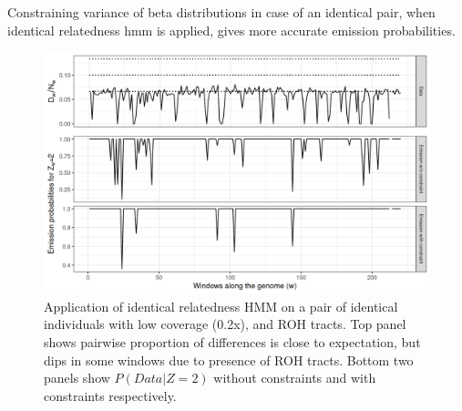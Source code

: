 \documentclass[12pt, letterpaper]{article}
\begin{document}
Constraining variance of beta distributions in case of an identical pair, when identical relatedness hmm is applied, gives more accurate emission probabilities.
\begin{figure}[htp]
    \centering
    \includegraphics[width=18cm]{supplementary_info/plots/contam0_inbred1_run57_coverage0.2_asc0_inputMode_hapProbs_fil0_pair0_15_relid_emissions_bnds.png}
    \caption{Application of identical relatedness HMM on a pair of identical individuals with low coverage (0.2x), and ROH tracts. Top panel shows pairwise proportion of differences is close to expectation, but dips in some windows due to presence of ROH tracts. Bottom two panels show $P(Data|Z=2)$ without constraints and with constraints respectively.}
    \label{figS3}
\end{figure}
\end{document}

